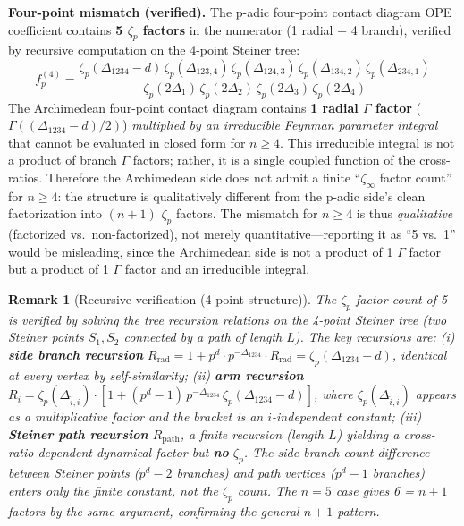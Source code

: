 \documentclass[11pt,a4paper]{article}
\newtheorem{remark}{Remark}
\begin{document}
\medskip\noindent
\textbf{Four-point mismatch (verified).}
The p-adic four-point contact diagram OPE coefficient contains \textbf{5 $\zeta_p$ factors} in the numerator (1 radial + 4 branch), verified by recursive computation on the 4-point Steiner tree:
\begin{equation}
f_p^{(4)} = \frac{\zeta_p(\Delta_{1234}{-}d)\,\zeta_p(\Delta_{123,4})\,\zeta_p(\Delta_{124,3})\,\zeta_p(\Delta_{134,2})\,\zeta_p(\Delta_{234,1})}{\zeta_p(2\Delta_1)\,\zeta_p(2\Delta_2)\,\zeta_p(2\Delta_3)\,\zeta_p(2\Delta_4)}
\end{equation}
The Archimedean four-point contact diagram contains \textbf{1 radial $\Gamma$ factor} ($\Gamma((\Delta_{1234}{-}d)/2)$) \emph{multiplied by an irreducible Feynman parameter integral} that cannot be evaluated in closed form for $n \geq 4$. This irreducible integral is not a product of branch $\Gamma$ factors; rather, it is a single coupled function of the cross-ratios. Therefore the Archimedean side does not admit a finite ``$\zeta_\infty$ factor count'' for $n \geq 4$: the structure is qualitatively different from the p-adic side's clean factorization into $(n{+}1)$ $\zeta_p$ factors. The mismatch for $n \geq 4$ is thus \emph{qualitative} (factorized vs.\ non-factorized), not merely quantitative---reporting it as ``5 vs.\ 1'' would be misleading, since the Archimedean side is not a product of 1 $\Gamma$ factor but a product of 1 $\Gamma$ factor and an irreducible integral.

\begin{remark}[Recursive verification (4-point structure)]
The $\zeta_p$ factor count of 5 is verified by solving the tree recursion relations on the 4-point Steiner tree (two Steiner points $S_1, S_2$ connected by a path of length $L$). The key recursions are: (i) \textbf{side branch recursion} $R_{\text{rad}} = 1 + p^d \cdot p^{-\Delta_{1234}} \cdot R_{\text{rad}} = \zeta_p(\Delta_{1234}{-}d)$, identical at every vertex by self-similarity; (ii) \textbf{arm recursion} $R_i = \zeta_p(\Delta_{\hat{i},i}) \cdot [1 + (p^d{-}1)\,p^{-\Delta_{1234}}\,\zeta_p(\Delta_{1234}{-}d)]$, where $\zeta_p(\Delta_{\hat{i},i})$ appears as a multiplicative factor and the bracket is an $i$-independent constant; (iii) \textbf{Steiner path recursion} $R_{\text{path}}$, a \emph{finite} recursion (length $L$) yielding a cross-ratio-dependent dynamical factor but \textbf{no} $\zeta_p$. The side-branch count difference between Steiner points ($p^d{-}2$ branches) and path vertices ($p^d{-}1$ branches) enters only the finite constant, not the $\zeta_p$ count. The $n = 5$ case gives 6 = $n{+}1$ factors by the same argument, confirming the general $n{+}1$ pattern.
\end{remark}
\end{document}
